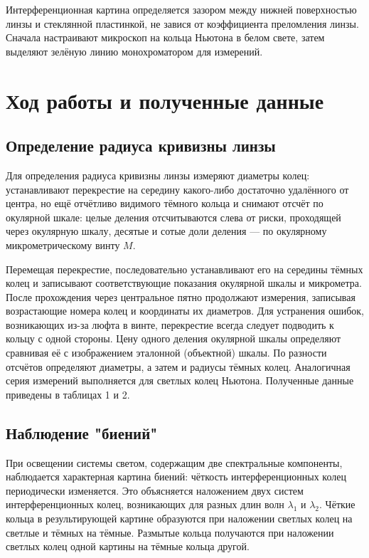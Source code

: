 \documentclass[a4paper, 12pt]{article}
\begin{document}
Интерференционная картина определяется зазором между нижней поверхностью линзы и стеклянной пластинкой, не завися от коэффициента преломления линзы. Сначала настраивают микроскоп на кольца Ньютона в белом свете, затем выделяют зелёную линию монохроматором для измерений.

\section*{Ход работы и полученные данные}
\subsection*{Определение радиуса кривизны линзы}

\quad Для определения радиуса кривизны линзы измеряют диаметры колец: устанавливают перекрестие на середину какого-либо достаточно удалённого от центра, но ещё отчётливо видимого тёмного кольца и снимают отсчёт по окулярной шкале: целые деления отсчитываются слева от риски, проходящей через окулярную шкалу, десятые и сотые доли деления — по окулярному микрометрическому винту $M$.

Перемещая перекрестие, последовательно устанавливают его на середины тёмных колец и записывают соответствующие показания окулярной шкалы и микрометра. После прохождения через центральное пятно продолжают измерения, записывая возрастающие номера колец и координаты их диаметров. Для устранения ошибок, возникающих из-за люфта в винте, перекрестие всегда следует подводить к кольцу с одной стороны. Цену одного деления окулярной шкалы определяют сравнивая её с изображением эталонной (объектной) шкалы. По разности отсчётов определяют диаметры, а затем и радиусы тёмных колец. Аналогичная серия измерений выполняется для светлых колец Ньютона.
Полученные данные приведены в таблицах 1 и 2.

\subsection*{Наблюдение "биений"}

\quad При освещении системы светом, содержащим две спектральные компоненты, наблюдается характерная картина биений: чёткость интерференционных колец периодически изменяется. Это объясняется наложением двух систем интерференционных колец, возникающих для разных длин волн $\lambda_1$ и $\lambda_2$. Чёткие кольца в результирующей картине образуются при наложении светлых колец на светлые и тёмных на тёмные. Размытые кольца получаются при наложении светлых колец одной картины на тёмные кольца другой. 
\end{document}
